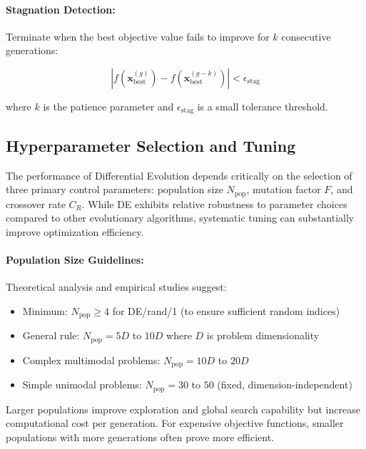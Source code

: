 \documentclass[12pt,a4paper]{report}
\begin{document}
\paragraph{Stagnation Detection:}
Terminate when the best objective value fails to improve for $k$ consecutive generations:

\begin{equation}
\left| f(\mathbf{x}_{\text{best}}^{(g)}) - f(\mathbf{x}_{\text{best}}^{(g-k)}) \right| < \epsilon_{\text{stag}}
\end{equation}

where $k$ is the patience parameter and $\epsilon_{\text{stag}}$ is a small tolerance threshold.

\subsection{Hyperparameter Selection and Tuning}

The performance of Differential Evolution depends critically on the selection of three primary control parameters: population size $N_{\text{pop}}$, mutation factor $F$, and crossover rate $C_R$. While DE exhibits relative robustness to parameter choices compared to other evolutionary algorithms, systematic tuning can substantially improve optimization efficiency.

\paragraph{Population Size Guidelines:}

Theoretical analysis and empirical studies suggest:
\begin{itemize}
    \item Minimum: $N_{\text{pop}} \geq 4$ for DE/rand/1 (to ensure sufficient random indices)
    \item General rule: $N_{\text{pop}} = 5D$ to $10D$ where $D$ is problem dimensionality
    \item Complex multimodal problems: $N_{\text{pop}} = 10D$ to $20D$
    \item Simple unimodal problems: $N_{\text{pop}} = 30$ to $50$ (fixed, dimension-independent)
\end{itemize}

Larger populations improve exploration and global search capability but increase computational cost per generation. For expensive objective functions, smaller populations with more generations often prove more efficient.
\end{document}
